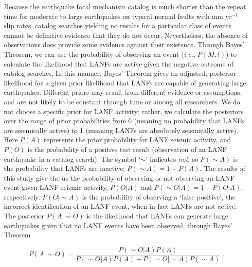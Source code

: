 \documentclass[draft,grl]{AGUTeX}
\begin{document}
\begin{article}
Because the earthquake focal mechanism catalog is much shorter than the repeat
time for moderate to large earthquakes on typical normal faults with mm
yr$^{-1}$ slip rates, catalog searches yielding no results for a particular
class of events cannot be definitive evidence that they do not occur.
Nevertheless, the absence of observations does provide some evidence against
their existence. Through Bayes' Theorem, we can use the probability of
observing an event (\emph{i.e.}, $P(M,t)$) to calculate the likelihood that
LANFs are active given the negative outcome of catalog searches. In this
manner, Bayes' Theorem gives an adjusted, posterior likelihood for a given
prior likelihood that LANFs are capable of generating large earthquakes.
Different priors may result from different evidence or assumptions, and are not
likely to be constant through time or among all researchers. We do not choose
a specific prior for LANF activity; rather, we calculate the posteriors over
the range of prior probabilities from 0 (meaning no probability that LANFs are
seismically active) to 1 (meaning LANFs are absolutely seismically active).
Here $P(A)$ represents the prior probability for LANF seismic activity, and
$P(O)$ is the probability of a positive test result (observation of an LANF
earthquake in a catalog search).  The symbol `$\sim$' indicates \emph{not}, so
$P(\sim A)$ is the probability that LANFs are inactive;  $ P(\sim A)
= 1 - P(A)$.  The results of this study give the us the probability of
observing or not observing an LANF event given LANF seismic activity, $P(O|A)$
and $P(\sim O | A) = 1 - P(O|A)$, respectively. $P(O | \sim A)$ is the
probability of observing a `false positive', the incorrect identification of an
LANF event, when in fact LANFs are not active.  The posterior $P(A |\sim O)$ is
the likelihood that LANFs can generate large earthquakes given that no LANF
events have been observed, through Bayes' Theorem

\begin{equation}
P(A | \sim O) = \frac{P(\sim O|A) P(A)}
{P(\sim O|A)P(A) + P(\sim O|\sim A)P(\sim A)} \;.
\label{BayesRule}
\end{equation}


\end{article}
\end{document}
